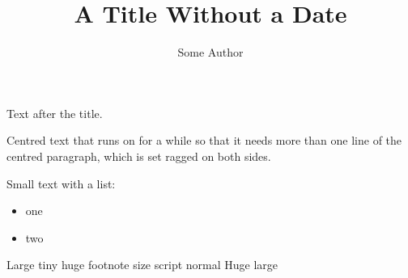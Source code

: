 \documentclass{article}
\title{A Title Without a Date}
\author{Some Author}
\begin{document}
\maketitle
Text after the title.
\begin{center}
Centred text that runs on for a while so that it needs more than one line of the centred paragraph, which is set ragged on both sides.
\end{center}
{\small Small text with a list:
\begin{itemize}
\item one
\item two
\end{itemize}}
{\Large Large} {\tiny tiny} {\huge huge} {\footnotesize footnote size} {\scriptsize script} {\normalsize normal} {\Huge Huge} {\large large}
\end{document}

